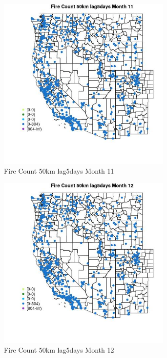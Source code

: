 \begin{figure} 
\centering  
\includegraphics[width=0.77\textwidth]{Code_Outputs/Report_ML_input_PM25_Step4_part_f_de_duplicated_aveswNAs_MapObsMo11Fire_Count_50km_lag5days.jpg} 
\caption{\label{fig:Report_ML_input_PM25_Step4_part_f_de_duplicated_aveswNAsMapObsMo11Fire_Count_50km_lag5days}Fire Count 50km lag5days Month 11} 
\end{figure} 
 

\begin{figure} 
\centering  
\includegraphics[width=0.77\textwidth]{Code_Outputs/Report_ML_input_PM25_Step4_part_f_de_duplicated_aveswNAs_MapObsMo12Fire_Count_50km_lag5days.jpg} 
\caption{\label{fig:Report_ML_input_PM25_Step4_part_f_de_duplicated_aveswNAsMapObsMo12Fire_Count_50km_lag5days}Fire Count 50km lag5days Month 12} 
\end{figure} 
 

